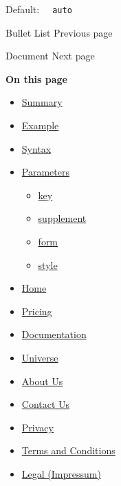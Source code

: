 Default: \texttt{\ }{\texttt{\ auto\ }}\texttt{\ }

\href{/docs/reference/model/list/}{\pandocbounded{}}

{ Bullet List } { Previous page }

\href{/docs/reference/model/document/}{\pandocbounded{}}

{ Document } { Next page }

\textbf{On this page}

\begin{itemize}
\tightlist
\item
  \hyperref[summary]{Summary}
\item
  \hyperref[example]{Example}
\item
  \hyperref[syntax]{Syntax}
\item
  \hyperref[parameters]{Parameters}

  \begin{itemize}
  \tightlist
  \item
    \hyperref[parameters-key]{key}
  \item
    \hyperref[parameters-supplement]{supplement}
  \item
    \hyperref[parameters-form]{form}
  \item
    \hyperref[parameters-style]{style}
  \end{itemize}
\end{itemize}

\begin{itemize}
\tightlist
\item
  \href{/}{Home}
\item
  \href{/pricing/}{Pricing}
\item
  \href{/docs/}{Documentation}
\item
  \href{/universe/}{Universe}
\item
  \href{/about/}{About Us}
\item
  \href{/contact/}{Contact Us}
\item
  \href{/privacy/}{Privacy}
\item
  \href{https://typst.app/terms}{Terms and Conditions}
\item
  \href{/legal/}{Legal (Impressum)}
\end{itemize}

